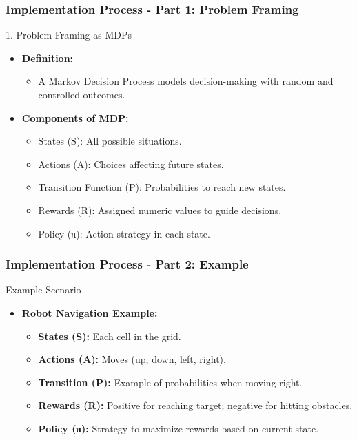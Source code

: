 \documentclass{beamer}
\begin{document}
\begin{frame}[fragile]
    \frametitle{Implementation Process - Part 1: Problem Framing}

    \begin{block}{1. Problem Framing as MDPs}
        \begin{itemize}
            \item \textbf{Definition:} 
                \begin{itemize}
                    \item A Markov Decision Process models decision-making with random and controlled outcomes.
                \end{itemize}
            \item \textbf{Components of MDP:}
                \begin{itemize}
                    \item States (S): All possible situations.
                    \item Actions (A): Choices affecting future states.
                    \item Transition Function (P): Probabilities to reach new states.
                    \item Rewards (R): Assigned numeric values to guide decisions.
                    \item Policy (π): Action strategy in each state.
                \end{itemize}
        \end{itemize}
    \end{block}
\end{frame}

\begin{frame}[fragile]
    \frametitle{Implementation Process - Part 2: Example}

    \begin{block}{Example Scenario}
        \begin{itemize}
            \item \textbf{Robot Navigation Example:}
                \begin{itemize}
                    \item \textbf{States (S):} Each cell in the grid.
                    \item \textbf{Actions (A):} Moves (up, down, left, right).
                    \item \textbf{Transition (P):} Example of probabilities when moving right.
                    \item \textbf{Rewards (R):} Positive for reaching target; negative for hitting obstacles.
                    \item \textbf{Policy (π):} Strategy to maximize rewards based on current state.
                \end{itemize}
        \end{itemize}
    \end{block}
\end{frame}
\end{document}
